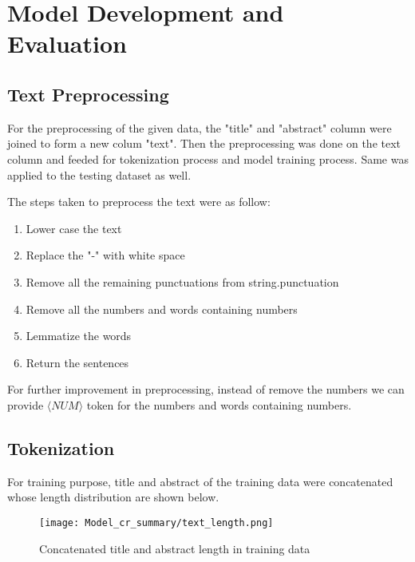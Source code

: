 \chapter{Model Development and Evaluation}
\section{Text Preprocessing}
For the preprocessing of the given data, the "title" and "abstract" column were joined to form a new colum "text". Then the preprocessing was done on the text column and feeded for tokenization process and model training process. Same was applied to the testing dataset as well.

The steps taken to preprocess the text were as follow:

\begin{enumerate}
    \item Lower case the text 
    \item Replace the "-" with white space 
    \item Remove all the remaining punctuations from string.punctuation
    \item Remove all the numbers and words containing numbers 
    \item Lemmatize the words 
    \item Return the sentences
\end{enumerate}

For further improvement in preprocessing, instead of remove the numbers we can provide  $\langle NUM \rangle$ token for the numbers and words containing numbers.

\section{Tokenization}
For training purpose, title and abstract of the training data were concatenated whose length distribution are shown below.

\begin{figure}[H]
    \centering
    \texttt{[image: Model\_cr\_summary/text\_length.png]}
    \caption{Concatenated title and abstract length in training data}
    \label{fig:Concatenated title and abstract length in training data}
\end{figure}

